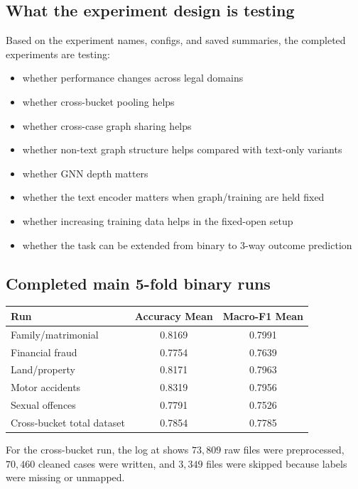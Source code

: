 \documentclass[12pt,a4paper]{article}
\begin{document}
\subsection*{What the experiment design is testing}

Based on the experiment names, configs, and saved summaries, the completed experiments are testing:

\begin{itemize}[noitemsep]
\item whether performance changes across legal domains
\item whether cross-bucket pooling helps
\item whether cross-case graph sharing helps
\item whether non-text graph structure helps compared with text-only variants
\item whether GNN depth matters
\item whether the text encoder matters when graph/training are held fixed
\item whether increasing training data helps in the fixed-open setup
\item whether the task can be extended from binary to 3-way outcome prediction
\end{itemize}

\subsection*{Completed main 5-fold binary runs}

\begin{center}
\small
\begin{tabular}{lcc}
\toprule
\textbf{Run} & \textbf{Accuracy Mean} & \textbf{Macro-F1 Mean} \\
\midrule
Family/matrimonial & 0.8169 & 0.7991 \\
Financial fraud & 0.7754 & 0.7639 \\
Land/property & 0.8171 & 0.7963 \\
Motor accidents & 0.8319 & 0.7956 \\
Sexual offences & 0.7791 & 0.7526 \\
Cross-bucket total dataset & 0.7854 & 0.7785 \\
\bottomrule
\end{tabular}
\end{center}

For the cross-bucket run, the log at  shows \(73{,}809\) raw files were preprocessed, \(70{,}460\) cleaned cases were written, and \(3{,}349\) files were skipped because labels were missing or unmapped.
\end{document}
